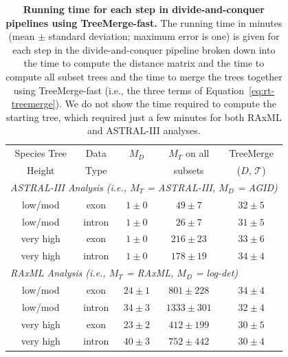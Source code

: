 \begin{table}[!h]
\caption{{\bf Running time for each step in divide-and-conquer pipelines using TreeMerge-fast.}
The running time in minutes (mean $\pm$ standard deviation; maximum error is one) is given for each step in the divide-and-conquer pipeline broken down into the time to compute the distance matrix and the time to compute all subset trees and the time to merge the trees together using TreeMerge-fast (i.e., the three terms of Equation~\ref{eq:rt-treemerge}).
We do not show the time required to compute the starting tree, which required just a few minutes for both RAxML and ASTRAL-III analyses.
}
\label{tab:treemerge-s2}
\centering
\begin{tabular}{ccccc}
\toprule
Species Tree & Data & $M_D$ & $M_T$ on all & TreeMerge \\
Height & Type & & subsets &($D$, $\mathcal{T}$) \\
\midrule
\multicolumn{5}{l}{\em ASTRAL-III Analysis (i.e., $M_T$ = ASTRAL-III, $M_D$ = AGID)}\\[0.5ex]
 low/mod & exon & $1 \pm 0$ & $49 \pm 7$ & $32 \pm 5$\\
 low/mod & intron & $1 \pm 0$ & $26 \pm 7$ & $31 \pm 5$\\
 very high & exon & $1 \pm 0$  & $216 \pm 23$ & $33 \pm 6$\\
 very high & intron & $1 \pm 0$ & $178 \pm 19$ & $34 \pm 4$\\[2ex]
\multicolumn{5}{l}{\em RAxML Analysis (i.e., $M_T$ = RAxML, $M_D$ = log-det)}\\[0.5ex]
 low/mod & exon & $24 \pm 1$ & $801 \pm 228$ & $34 \pm 4$\\
 low/mod & intron & $34 \pm 3$ & $1333 \pm 301$ & $32 \pm 4$\\
 very high & exon & $23 \pm 2$ & $412 \pm 199$ & $30 \pm 5$\\
 very high & intron & $40 \pm 3$ & $752 \pm 442$ & $30 \pm 4$\\
\bottomrule
\end{tabular}
\end{table}

\clearpage
